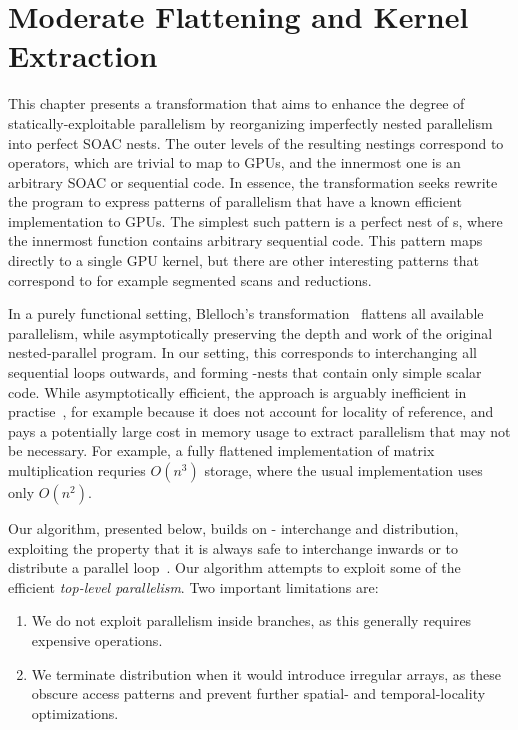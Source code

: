 \renewcommand{\G}[1]{G#1}

\chapter{Moderate Flattening and Kernel Extraction}
\label{chap:kernel-extraction}

This chapter presents a transformation that aims to enhance the degree
of statically-exploitable parallelism by reorganizing imperfectly
nested parallelism into perfect SOAC nests.  The outer levels of the
resulting nestings correspond to  operators, which are trivial
to map to GPUs, and the innermost one is an arbitrary SOAC or
sequential code.  In essence, the transformation seeks rewrite the
program to express patterns of parallelism that have a known efficient
implementation to GPUs.  The simplest such pattern is a perfect nest
of s, where the innermost function contains arbitrary
sequential code.  This pattern maps directly to a single GPU kernel,
but there are other interesting patterns that correspond to for
example segmented scans and reductions.

In a purely functional setting, Blelloch's
transformation~\cite{blelloch1990vector} flattens all available
parallelism, while asymptotically preserving the depth and work of the
original nested-parallel program.  In our setting, this corresponds to
interchanging all sequential loops outwards, and forming
-nests that contain only simple scalar code.  While
asymptotically efficient, the approach is arguably inefficient in
practise~\cite{bergstrom2012nested}, for example because it does not
account for locality of reference, and pays a potentially large cost
in memory usage to extract parallelism that may not be necessary.  For
example, a fully flattened implementation of matrix multiplication
requries $O(n^{3})$ storage, where the usual implementation uses only
$O(n^{2})$.

Our algorithm, presented below, builds on -
interchange and  distribution, exploiting the property that it
is always safe to interchange inwards or to distribute a parallel
loop~\cite{Allen-Kennedy2002}.  Our algorithm attempts to exploit some
of the efficient \textit{top-level parallelism}.  Two important
limitations are:

\begin{enumerate}
\item We do not exploit parallelism inside  branches, as this
  generally requires expensive  operations.
\item We terminate distribution when it would introduce irregular
  arrays, as these obscure access patterns and prevent further
  spatial- and temporal-locality optimizations.
\end{enumerate}

